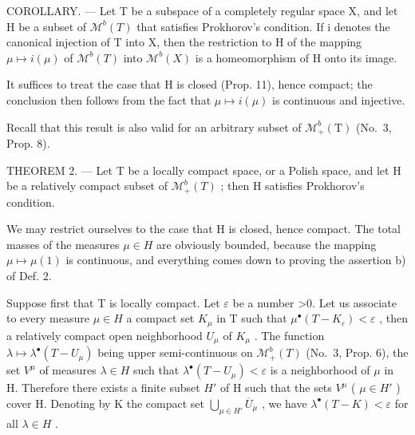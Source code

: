 COROLLARY. --- Let T be a subspace of a completely regular space X, and let H be a subset of \(\mathcal{M}^{b}(T)\) that satisfies Prokhorov's condition. If i denotes the canonical injection of T into X, then the restriction to H of the mapping \(\mu\mapsto i(\mu)\) of \(\mathcal{M}^{b}(T)\) into \(\mathcal{M}^{b}(X)\) is a homeomorphism of H onto its image.

It suffices to treat the case that H is closed (Prop. 11), hence compact; the conclusion then follows from the fact that \(\mu \mapsto i(\mu)\) is continuous and injective.

Recall that this result is also valid for an arbitrary subset of \(\mathcal{M}_{+}^{b}(\mathrm{T})\) (No.~3, Prop. 8).

THEOREM 2. --- Let T be a locally compact space, or a Polish space, and let H be a relatively compact subset of \(\mathcal{M}_{+}^{b}(T)\) ; then H satisfies Prokhorov's condition.

We may restrict ourselves to the case that H is closed, hence compact. The total masses of the measures \(\mu \in H\) are obviously bounded, because the mapping \(\mu \mapsto \mu(1)\) is continuous, and everything comes down to proving the assertion b) of Def. 2.

Suppose first that T is locally compact. Let \(\varepsilon\) be a number \textgreater0. Let us associate to every measure \(\mu\in H\) a compact set \(K_{\mu}\) in T such that \(\mu^{\bullet}(T-K_{\varepsilon})<\varepsilon\) , then a relatively compact open neighborhood \(U_{\mu}\) of \(K_{\mu}\) . The function \(\lambda\mapsto\lambda^{\bullet}(T-U_{\mu})\) being upper semi-continuous on \(\mathcal{M}_{+}^{b}(T)\) (No.~3, Prop. 6), the set \(V^{\mu}\) of measures \(\lambda\in H\) such that \(\lambda^{\bullet}(T-U_{\mu})<\varepsilon\) is a neighborhood of \(\mu\) in H. Therefore there exists a finite subset \(H'\) of H such that the sets \(V^{\mu}\) ( \(\mu\in H'\) ) cover H. Denoting by K the compact set \(\bigcup_{\mu\in H'}\overline{U}_{\mu}\) , we have \(\lambda^{\bullet}(T-K)<\varepsilon\) for all \(\lambda\in H\) .

